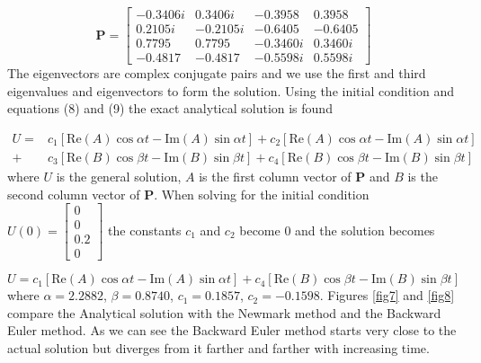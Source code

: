 \documentclass{article}
\begin{document}
				\begin{equation*}
					\textbf{P} = \begin{bmatrix}-0.3406i&0.3406i&-0.3958&0.3958\\0.2105i&-0.2105i&-0.6405&-0.6405\\0.7795&0.7795&-0.3460i&0.3460i\\-0.4817&-0.4817&-0.5598i&0.5598i\end{bmatrix}
				\end{equation*}
The eigenvectors are complex conjugate pairs and we use the first and third eigenvalues and eigenvectors to form the solution. Using the initial condition and equations (8) and (9) the exact analytical solution is found

				\begin{align*}
					U = &c_1\left[\text{Re}(A)\cos{\alpha t} -\text{Im}(A)\sin{\alpha t}\right]+c_2\left[\text{Re}(A)\cos{\alpha t} -\text{Im}(A)\sin{\alpha t}\right] \\ + &c_3\left[\text{Re}(B)\cos{\beta t} -\text{Im}(B)\sin{\beta t}\right]+c_4\left[\text{Re}(B)\cos{\beta t} -\text{Im}(B)\sin{\beta t}\right]
				\end{align*}
where $U$ is the general solution, $A$ is the first column vector of $\textbf{P}$ and $B$ is the second column vector of $\textbf{P}$. When solving for the initial condition $U(0) = \begin{bmatrix}0\\0\\0.2\\0\end{bmatrix}$ the constants $c_1$ and $c_2$ become 0 and the solution becomes

				\begin{equation*}
					U = c_1\left[\text{Re}(A)\cos{\alpha t} -\text{Im}(A)\sin{\alpha t}\right]+c_4\left[\text{Re}(B)\cos{\beta t} -\text{Im}(B)\sin{\beta t}\right]
				\end{equation*}
where $\alpha = 2.2882$, $\beta = 0.8740$, $c_1 = 0.1857$, $c_2 = -0.1598$. Figures \ref{fig7} and \ref{fig8} compare the Analytical solution with the Newmark method and the Backward Euler method. As we can see the Backward Euler method starts very close to the actual solution but diverges from it farther and farther with increasing time.
\end{document}

